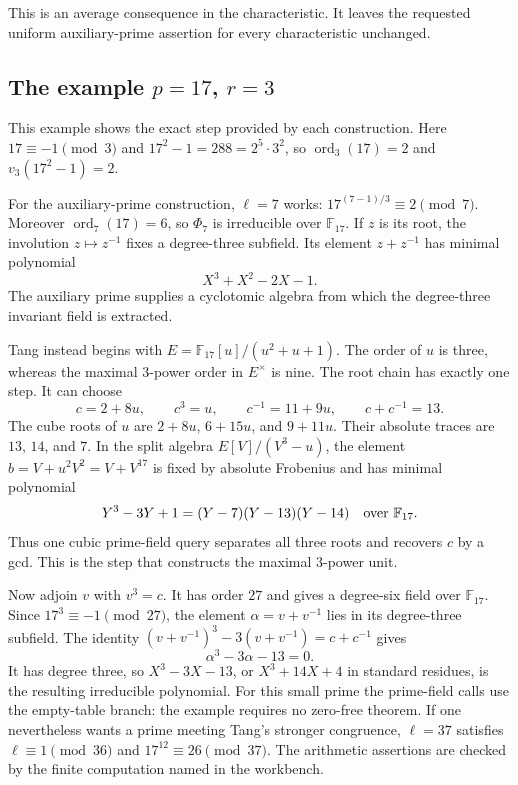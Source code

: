 \documentclass[11pt]{article}
\theoremstyle{definition}
\theoremstyle{remark}
\begin{document}
This is an average consequence in the characteristic. It leaves the
requested uniform auxiliary-prime assertion for every characteristic
unchanged.


\subsection{The example \texorpdfstring{$p=17$, $r=3$}{p=17, r=3}}

This example shows the exact step provided by each construction.
Here $17\equiv-1\pmod3$ and
$17^2-1=288=2^5\cdot3^2$, so
$\operatorname{ord}_3(17)=2$ and $v_3(17^2-1)=2$.

For the auxiliary-prime construction, $\ell=7$ works:
$17^{(7-1)/3}\equiv2\pmod7$. Moreover
$\operatorname{ord}_7(17)=6$, so $\Phi_7$ is irreducible over
$\mathbb F_{17}$. If $z$ is its root, the involution
$z\mapsto z^{-1}$ fixes a degree-three subfield. Its element
$z+z^{-1}$ has minimal polynomial
\[
 X^3+X^2-2X-1.
\]
The auxiliary prime supplies a cyclotomic algebra from which the
degree-three invariant field is extracted.

Tang instead begins with
$E=\mathbb F_{17}[u]/(u^2+u+1)$. The order of $u$ is three,
whereas the maximal $3$-power order in $E^\times$ is nine.
The root chain has exactly one step. It can choose
\[
 c=2+8u,\qquad c^3=u,\qquad
 c^{-1}=11+9u,\qquad c+c^{-1}=13.
\]
The cube roots of $u$ are $2+8u$, $6+15u$, and $9+11u$.
Their absolute traces are $13$, $14$, and $7$. In the split
algebra $E[V]/(V^3-u)$, the element
$b=V+u^2V^2=V+V^{17}$ is fixed by absolute Frobenius and has
minimal polynomial
\[
 Y^3-3Y+1=(Y-7)(Y-13)(Y-14)
       \quad\hbox{over }\mathbb F_{17}.
\]
Thus one cubic prime-field query separates all three roots and
recovers $c$ by a gcd. This is the step that constructs the
maximal $3$-power unit.

Now adjoin $v$ with $v^3=c$. It has order $27$ and gives a
degree-six field over $\mathbb F_{17}$. Since
$17^3\equiv-1\pmod{27}$, the element
$\alpha=v+v^{-1}$ lies in its degree-three subfield. The identity
$(v+v^{-1})^3-3(v+v^{-1})=c+c^{-1}$ gives
\[
 \alpha^3-3\alpha-13=0.
\]
It has degree three, so $X^3-3X-13$, or
$X^3+14X+4$ in standard residues, is the resulting irreducible
polynomial. For this small prime the prime-field calls use the
empty-table branch: the example requires no zero-free theorem.
If one nevertheless wants a prime meeting Tang's stronger
congruence, $\ell=37$ satisfies $\ell\equiv1\pmod{36}$ and
$17^{12}\equiv26\pmod{37}$. The arithmetic assertions are checked
by the finite computation named in the workbench.
\end{document}
